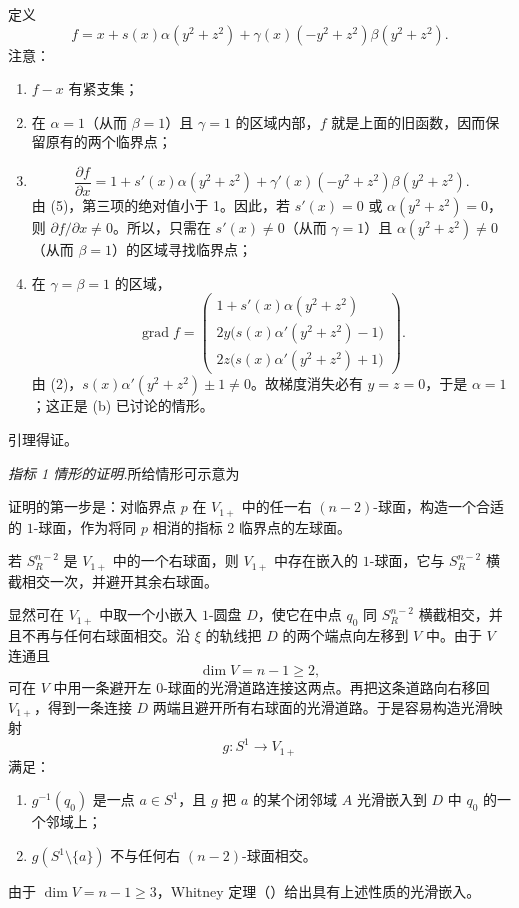 定义
\[
  f=x+s(x)\alpha(y^2+z^2)
  +\gamma(x)(-y^2+z^2)\beta(y^2+z^2).
\]
注意：
\begin{enumerate}[label=(\alph*)]
  \item $f-x$ 有紧支集；
  \item 在 $\alpha=1$（从而 $\beta=1$）且 $\gamma=1$ 的区域内部，$f$ 就是上面的旧函数，因而保留原有的两个临界点；
  \item
  \[
    \frac{\partial f}{\partial x}
    =1+s'(x)\alpha(y^2+z^2)
     +\gamma'(x)(-y^2+z^2)\beta(y^2+z^2).
  \]
  由 (5)，第三项的绝对值小于 1。因此，若 $s'(x)=0$ 或 $\alpha(y^2+z^2)=0$，则 $\partial f/\partial x\neq0$。所以，只需在 $s'(x)\neq0$（从而 $\gamma=1$）且 $\alpha(y^2+z^2)\neq0$（从而 $\beta=1$）的区域寻找临界点；
  \item 在 $\gamma=\beta=1$ 的区域，
  \[
  \operatorname{grad}f=
  \begin{pmatrix}
    1+s'(x)\alpha(y^2+z^2)\\
    2y\bigl(s(x)\alpha'(y^2+z^2)-1\bigr)\\
    2z\bigl(s(x)\alpha'(y^2+z^2)+1\bigr)
  \end{pmatrix}.
  \]
  由 (2)，$s(x)\alpha'(y^2+z^2)\pm1\neq0$。故梯度消失必有 $y=z=0$，于是 $\alpha=1$；这正是 (b) 已讨论的情形。
\end{enumerate}
引理得证。
\EndProof

\par\medskip\noindent\textit{ 指标 1 情形的证明.}\quad 所给情形可示意为
\begin{center}
  \FigEightIndexOneSchematic
\end{center}
证明的第一步是：对临界点 $p$ 在 $V_{1+}$ 中的任一右 $(n-2)$-球面，构造一个合适的 $1$-球面，作为将同 $p$ 相消的指标 2 临界点的左球面。

若 $S_R^{n-2}$ 是 $V_{1+}$ 中的一个右球面，则 $V_{1+}$ 中存在嵌入的 $1$-球面，它与 $S_R^{n-2}$ 横截相交一次，并避开其余右球面。

\Proof 显然可在 $V_{1+}$ 中取一个小嵌入 $1$-圆盘 $D$，使它在中点 $q_0$ 同 $S_R^{n-2}$ 横截相交，并且不再与任何右球面相交。沿 $\xi$ 的轨线把 $D$ 的两个端点向左移到 $V$ 中。由于 $V$ 连通且
\[
  \dim V=n-1\geq2,
\]
可在 $V$ 中用一条避开左 $0$-球面的光滑道路连接这两点。再把这条道路向右移回 $V_{1+}$，得到一条连接 $D$ 两端且避开所有右球面的光滑道路。于是容易构造光滑映射
\[
  g:S^1\longrightarrow V_{1+}
\]
满足：
\begin{enumerate}[label=(\alph*)]
  \item $g^{-1}(q_0)$ 是一点 $a\in S^1$，且 $g$ 把 $a$ 的某个闭邻域 $A$ 光滑嵌入到 $D$ 中 $q_0$ 的一个邻域上；
  \item $g(S^1\setminus\{a\})$ 不与任何右 $(n-2)$-球面相交。
\end{enumerate}
由于 $\dim V=n-1\geq3$，Whitney 定理（）给出具有上述性质的光滑嵌入。
\EndProof

